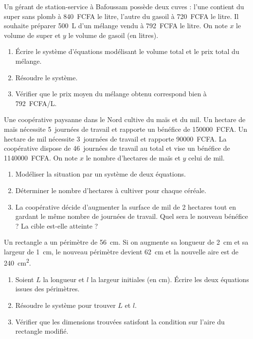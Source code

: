 \documentclass[11pt]{article}
\begin{document}
\begin{exercice}
Un gérant de station-service à Bafoussam possède deux cuves : l'une contient du super sans plomb à \SI{840}{FCFA} le litre, l'autre du gasoil à \SI{720}{FCFA} le litre. Il souhaite préparer \SI{500}{L} d'un mélange vendu à \SI{792}{FCFA} le litre. On note $x$ le volume de super et $y$ le volume de gasoil (en litres).
\begin{enumerate}
    \item Écrire le système d'équations modélisant le volume total et le prix total du mélange.
    \item Résoudre le système.
    \item Vérifier que le prix moyen du mélange obtenu correspond bien à \SI{792}{FCFA}/L.
\end{enumerate}
\end{exercice}

\begin{exercice}
Une coopérative paysanne dans le Nord cultive du maïs et du mil. Un hectare de maïs nécessite \SI{5}{journées} de travail et rapporte un bénéfice de \SI{150000}{FCFA}. Un hectare de mil nécessite \SI{3}{journées} de travail et rapporte \SI{90000}{FCFA}. La coopérative dispose de \SI{46}{journées} de travail au total et vise un bénéfice de \SI{1140000}{FCFA}. On note $x$ le nombre d'hectares de maïs et $y$ celui de mil.
\begin{enumerate}
    \item Modéliser la situation par un système de deux équations.
    \item Déterminer le nombre d'hectares à cultiver pour chaque céréale.
    \item La coopérative décide d'augmenter la surface de mil de 2 hectares tout en gardant le même nombre de journées de travail. Quel sera le nouveau bénéfice ? La cible est-elle atteinte ?
\end{enumerate}
\end{exercice}

\begin{exercice}
Un rectangle a un périmètre de \SI{56}{cm}. Si on augmente sa longueur de \SI{2}{cm} et sa largeur de \SI{1}{cm}, le nouveau périmètre devient \SI{62}{cm} et la nouvelle aire est de \SI{240}{cm^2}.
\begin{enumerate}
    \item Soient $L$ la longueur et $l$ la largeur initiales (en cm). Écrire les deux équations issues des périmètres.
    \item Résoudre le système pour trouver $L$ et $l$.
    \item Vérifier que les dimensions trouvées satisfont la condition sur l'aire du rectangle modifié.
\end{enumerate}
\end{exercice}
\end{document}
